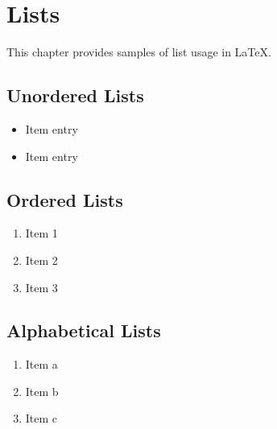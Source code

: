 

\chapter{Lists} \label{lists}

This chapter provides samples of list usage in LaTeX.

\section{Unordered Lists} \label{unordered-lists}

\begin{itemize}
	\item Item entry
	\item Item entry
\end{itemize}

\section{Ordered Lists} \label{ordered-lists}

\begin{enumerate}
	\item Item 1
	\item Item 2
	\item Item 3
\end{enumerate}

\section{Alphabetical Lists} \label{alphabetical-list}

\begin{enumerate}[label=(\alph*)]
	\item Item a
	\item Item b
	\item Item c
\end{enumerate}
